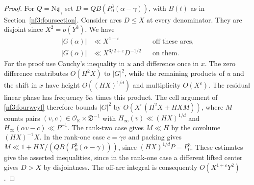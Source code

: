 \documentclass[11pt,letterpaper]{article}
\theoremstyle{definition}
\numberwithin{equation}{section}
\begin{document}
\begin{proof}
For $Q=\mathrm N\mathfrak q_\gamma$ set
$D=Q B(P_0^3(\alpha-\gamma))$, with $B(t)$ as in
Section~\ref{nf3:foursection}. Consider arcs $D\le X$ at every
denominator. They are disjoint since $X^2=o(Y^3)$. We have
\begin{align*}
 |G(\alpha)|&\ll X^{1+\varepsilon} &&\text{off these arcs},\\
 |G(\alpha)|&\ll X^{3/2+\varepsilon}D^{-1/2} &&\text{on them}.
\end{align*}
For the proof use Cauchy's inequality in $u$ and difference once in
$x$. The zero difference contributes $O(H^2X)$ to $|G|^2$, while the
remaining products of $u$ and the shift in $x$ have height
$O((HX)^{1/d})$ and multiplicity $O(X^\varepsilon)$. The residual
linear phase has frequency $6\alpha$ times this product. The cell
argument of \eqref{nf3:fourweyl} therefore bounds $|G|^2$ by
$O(X^\varepsilon(H^2X+HXM))$, where $M$ counts pairs
$(v,c)\in\mathcal O_{\mathbb K}\times\mathfrak D^{-1}$ with
$H_\infty(v)\ll(HX)^{1/d}$ and $H_\infty(\alpha v-c)\ll P^{-1}$.
The rank-two case gives $M\ll H$ by the covolume $(HX)^{-1}X$.
In the rank-one case $c=\gamma v$ and packing gives
$M\ll 1+HX/(Q B(P_0^3(\alpha-\gamma)))$, since
$(HX)^{1/d}P=P_0^3$. These estimates give the asserted inequalities, since in the rank-one
case a different lifted center gives $D>X$ by disjointness.
The off-arc integral is consequently $O(X^{1+\varepsilon}Y^2)$.


\end{proof}
\end{document}
